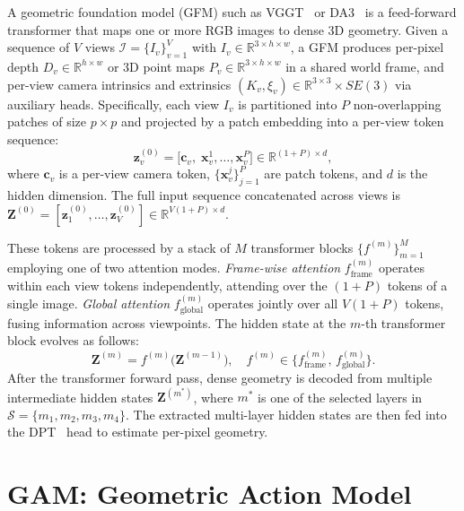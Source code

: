 \documentclass{llmxive}
\begin{document}
A geometric foundation model (GFM) such as VGGT~\citep{wang2025vggt} or DA3~\citep{lin2025depth} is a feed-forward transformer that maps one or more RGB images to dense 3D geometry. Given a sequence of $V$ views $\mathcal{I} = \{I_v\}_{v=1}^{V}$ with $I_v \in \mathbb{R}^{3 \times h \times w}$, a GFM produces per-pixel depth $D_v \in \mathbb{R}^{h \times w}$ or 3D point maps $P_v \in \mathbb{R}^{3 \times h \times w}$ in a shared world frame, and per-view camera intrinsics and extrinsics $(K_v, \xi_v) \in \mathbb{R}^{3\times 3} \times SE(3)$ via auxiliary heads.
Specifically, each view $I_v$ is partitioned into $P$ non-overlapping patches of size $p \times p$ and projected by a patch embedding into a per-view token sequence:
\begin{equation}
    \mathbf{z}_v^{(0)} = \big[\mathbf{c}_v,\; \mathbf{x}_v^1, \ldots, \mathbf{x}_v^{P}\big] \in \mathbb{R}^{(1+P) \times d},
\end{equation}
where $\mathbf{c}_v$ is a per-view camera token, $\{\mathbf{x}_v^j\}_{j=1}^{P}$ are patch tokens, and $d$ is the hidden dimension. The full input sequence concatenated across views is $\mathbf{Z}^{(0)} = [\mathbf{z}_1^{(0)}, \ldots, \mathbf{z}_V^{(0)}] \in \mathbb{R}^{V(1+P) \times d}$.

These tokens are processed by a stack of $M$ transformer blocks $\{{f^{(m)}}\} _{m=1}^M$ employing one of two attention modes. \emph{Frame-wise attention} $f_{\text{frame}}^{(m)}$ operates within each view tokens independently, attending over the $(1+P)$ tokens of a single image. \emph{Global attention} $f_{\text{global}}^{(m)}$ operates jointly over all $V (1+P)$ tokens, fusing information across viewpoints. The hidden state at the $m$-th transformer block evolves as follows:
\begin{equation}
    \mathbf{Z}^{(m)} = f^{(m)}\big(\mathbf{Z}^{(m-1)}\big), \quad f^{(m)} \in \{f_{\text{frame}}^{(m)},\, f_{\text{global}}^{(m)}\}.
\end{equation}
After the transformer forward pass, dense geometry is decoded from multiple intermediate hidden states $\mathbf{Z}^{(m^*)}$, where $m^*$ is one of the selected layers in $\mathcal{S}=\{m_1,m_2,m_3,m_4\}$. The extracted multi-layer hidden states are then fed into the DPT~\cite{ranftl2021vision} head to estimate per-pixel geometry.

\section{GAM: Geometric Action Model}
\label{sec:method}
\end{document}
